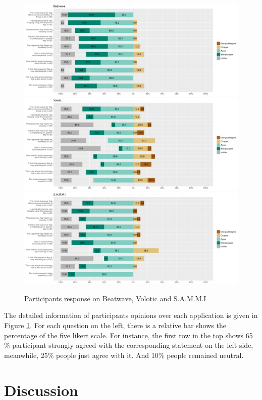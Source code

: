 \bigskip
\begin{figure}[h]
 \centering
 \includegraphics[width = \textwidth]{images/Beatwave.pdf}
 \includegraphics[width = \textwidth]{images/Volotic.pdf}
 \includegraphics[width = \textwidth]{images/SAMMI.pdf}
 \caption{Participants response on Beatwave, Volotic and S.A.M.M.I}
 \label{fig:result_response}
\end{figure}
\bigskip

The detailed information of participants opinions over each application is given in Figure \ref{fig:result_response}. For each question on the left, there is a relative bar shows the percentage of the five likert scale. For instance, the first row in the top shows 65$\%$ participant strongly agreed with the corresponding statement on the left side, meanwhile, 25$\%$ people just agree with it. And 10$\%$ people remained neutral.

\section{Discussion}
